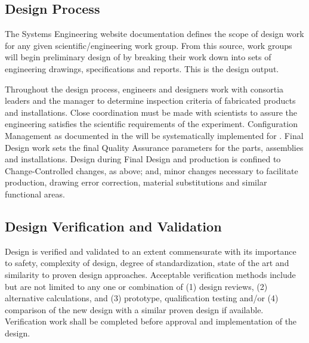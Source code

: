 \subsection{Design Process}

The  Systems Engineering website
documentation defines the scope of design work for any given
scientific/engineering work group. From this source, work groups
will begin preliminary design of  by breaking their work
down into sets of engineering drawings, specifications and
reports. This is the design output.

Throughout the design process, engineers and designers work with
consortia leaders and the   manager to
determine  inspection criteria of fabricated products and
installations. Close coordination must be made with 
scientists to assure the engineering satisfies the scientific
requirements of the experiment. Configuration Management as documented
in the   will be
systematically implemented for . Final Design work sets
the final Quality Assurance parameters for the parts, assemblies and
installations. Design during Final Design and production is confined
to Change-Controlled changes, as above; and, minor changes necessary
to facilitate production, drawing error correction, material
substitutions and similar functional areas.

\subsection{Design Verification and Validation}
\label{sec:verification}

Design is verified and validated to an extent commensurate with its
importance to safety, complexity of design, degree of standardization,
state of the art and similarity to proven design
approaches. Acceptable verification methods include but are not
limited to any one or combination of (1) design reviews, (2)
alternative calculations, and (3) prototype, qualification testing
and/or (4) comparison of the new design with a similar proven design
if available. Verification work shall be completed before approval and
implementation of the design.

